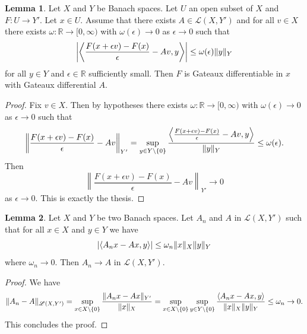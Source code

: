 \documentclass[a4paper,10pt,oneside]{amsbook}
\numberwithin{section}{chapter}
\numberwithin{equation}{chapter}
\theoremstyle{definition}
\newtheorem{prop}{Proposition}[chapter]
\newtheorem{lemma}[prop]{Lemma}
\DeclarePairedDelimiter{\norm}{\lVert}{\rVert}
\DeclarePairedDelimiter{\dual}{\langle}{\rangle}
\begin{document}
\begin{lemma}
\label{lemma:check-gateaux}
Let $X$ and $Y$ be Banach spaces. Let $U$ an open subset of $X$ and $F\colon U\to Y'$. Let $x\in U$. Assume that there exists $A\in\mathscr{L}(X,Y')$ and for all $v\in X$ there exists $\omega\colon\mathbb{R}\to[0,\infty)$ with $\omega(\epsilon)\to0$ as $\epsilon\to0$ such that
\[
\left|\left\langle\frac{F(x+\epsilon v)-F(x)}{\epsilon}-Av,y\right\rangle\right|\le\omega(\epsilon)\norm{y}_Y
\]
for all $y\in Y$ and $\epsilon\in\mathbb{R}$ sufficiently small. Then $F$ is Gateaux differentiable in $x$ with Gateaux differential $A$.
\end{lemma}
\begin{proof}
Fix $v\in X$. Then by hypotheses there exists $\omega\colon\mathbb{R}\to[0,\infty)$ with $\omega(\epsilon)\to0$ as $\epsilon\to0$ such that
\[
\left\lVert\frac{F(x+\epsilon v)-F(x)}{\epsilon}-Av\right\lVert_{Y'}=\sup_{y\in Y\setminus\{0\}}\frac{\left\langle\frac{F(x+\epsilon v)-F(x)}{\epsilon}-Av,y\right\rangle}{\norm{y}_Y}\le\omega(\epsilon).
\]
Then
\[
\left\lVert\frac{F(x+\epsilon v)-F(x)}{\epsilon}-Av\right\lVert_{Y'}\to0
\]
as $\epsilon\to 0$. This is exactly the thesis.
\end{proof}

\begin{lemma}
\label{lemma:check-continuity-gateaux}
Let $X$ and $Y$ be two Banach spaces. Let $A_n$ and $A$ in $\mathscr{L}(X,Y')$ such that for all $x\in X$ and $y\in Y$ we have
\[
|\dual{A_nx-Ax,y}|\le\omega_n\norm{x}_X\norm{y}_Y
\]
where $\omega_n\to0$. Then $A_n\to A$ in $\mathscr{L}(X,Y')$.
\end{lemma}
\begin{proof}
We have
\[
\norm{A_n-A}_{\mathscr{L}(X,Y')}=\sup_{x\in X\setminus\{0\}}\frac{\norm{A_nx-Ax}_{Y'}}{\norm{x}_X}=\sup_{x\in X\setminus\{0\}}\sup_{y\in Y\setminus\{0\}}\frac{\dual{A_nx-Ax,y}}{\norm{x}_X\norm{y}_Y}\le\omega_n\to 0.
\]
This concludes the proof.
\end{proof}

\end{document}
